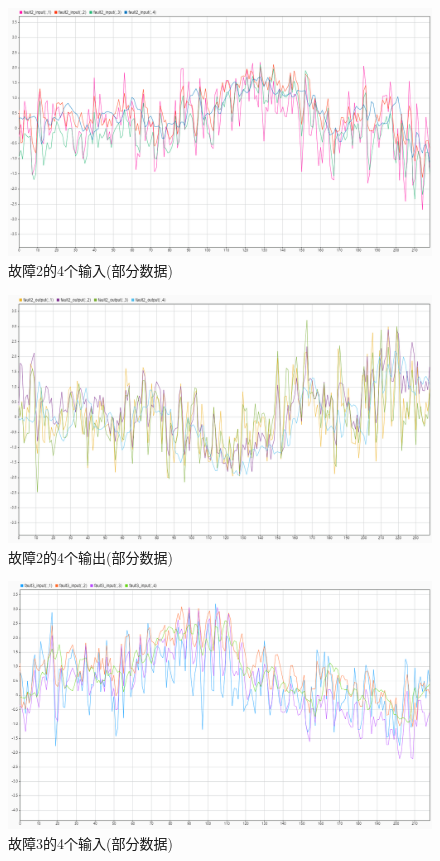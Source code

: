 \documentclass[lang=cn,11pt,a4paper]{elegantpaper}
\begin{document}
\begin{figure}[H] %
	\centering %
	\includegraphics[width=1.0\textwidth]{fault2_input} %
	\caption{故障2的4个输入(部分数据)} %
	\label{Fig.main2} %
\end{figure}
\begin{figure}[H] %
	\centering %
	\includegraphics[width=1.0\textwidth]{fault2_output} %
	\caption{故障2的4个输出(部分数据)} %
	\label{Fig.main2} %
\end{figure}
\begin{figure}[H] %
	\centering %
	\includegraphics[width=1.0\textwidth]{fault3_input} %
	\caption{故障3的4个输入(部分数据)} %
	\label{Fig.main2} %
\end{figure}
\end{document}
